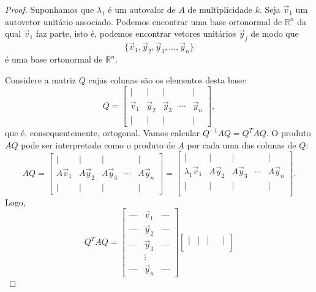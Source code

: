 \begin{proof}
	Suponhamos que $\lambda_1$ é um autovalor de $A$ de multiplicidade $k$. Seja $\vec{v}_1$ um autovetor unitário associado. Podemos encontrar uma base ortonormal de $\mathbb{R}^n$ da qual $\vec{v}_1$ faz parte, isto é, podemos encontrar vetores unitários $\vec{y}_j$ de modo que
	\begin{equation}
	\{ \vec{v}_1, \vec{y}_2, \vec{y}_3, \dots, \vec{y}_n \}
	\end{equation} é uma base ortonormal de $\mathbb{R}^n$.

	Considere a matriz $Q$ cujas colunas são os elementos desta base:
	\begin{equation}
	Q =
	\begin{bmatrix}
	| & | & | & & | \\
	\vec{v}_1 & \vec{y}_2 & \vec{y}_3 & \cdots &  \vec{y}_n \\
	| & | & | & & |
	\end{bmatrix},
	\end{equation} que é, consequentemente, ortogonal. Vamos calcular $Q^{-1} A Q = Q^T A Q$. O produto $AQ$ pode ser interpretado como o produto de $A$ por cada uma das colunas de $Q$:
	\begin{equation}
	AQ =
	\begin{bmatrix}
	| & | & | & & | \\
	A \vec{v}_1 & A \vec{y}_2 & A \vec{y}_3 & \cdots &  A\vec{y}_n \\
	| & | & | & & |
	\end{bmatrix} =
	\begin{bmatrix}
	| & | & | & & | \\
	\lambda_1 \vec{v}_1 & A \vec{y}_2 & A \vec{y}_3 & \cdots &  A\vec{y}_n \\
	| & | & | & & | \\
	\end{bmatrix}.
	\end{equation} Logo,
	\begin{equation}
	Q^TAQ =
	\begin{bmatrix}
	\text{---} & \vec{v}_1 & \text{---} \\
	\text{---} & \vec{y}_2 & \text{---} \\
	\text{---} & \vec{y}_3 &\text{---} \\
	& \vdots    &     \\
	\text{---} & \vec{y}_n & \text{---}
	\end{bmatrix}
	\begin{bmatrix}
	| & | & | & & | \\

\end{bmatrix}
\end{equation}
\end{proof}
